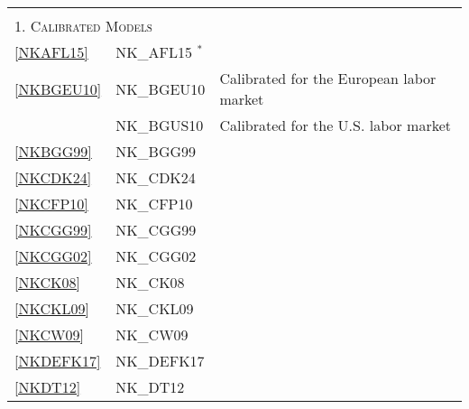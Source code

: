 \documentclass[11pt,a4paper]{article}
\begin{document}
	\vspace{-2cm}
	\begin{table}[H]
		\label{tab:modov}
		\begin{tabularx}{\textwidth}{lll}
			\hline \hline
			&& \\
			\multicolumn{3}{l}{\textsc{1. Calibrated Models}} \\
			\ref{NKAFL15} & NK\_AFL15 $ ^{\ast}$  & \cite{Angelonietal2015} \\
			\ref{NKBGEU10} & NK\_BGEU10 & \cite{BlanchardGali10} Calibrated for the European labor market \\
			& NK\_BGUS10 & \cite{BlanchardGali10} Calibrated for the U.S. labor market\\
			\ref{NKBGG99} & NK\_BGG99 & \cite{BernankeGertlerGilchrist1999} \\
			\ref{NKCDK24} & NK\_CDK24 & \cite{chan2024energy}  \\
			\ref{NKCFP10} & NK\_CFP10 & \cite{carlstrom2010optimal}  \\
			\ref{NKCGG99} & NK\_CGG99 & \cite{ClaridaGaliGertler1999}  \\
			\ref{NKCGG02}  & NK\_CGG02 & \cite{ClaridaGaliGertler2002}  \\
			\ref{NKCK08} & NK\_CK08 & \cite{ChristoffelKuester2008} \\
			\ref{NKCKL09} & NK\_CKL09 & \cite{ChristoffelKuesterLinzert2009} \\
			\ref{NKCW09} & NK\_CW09 & \cite{CurdiaWoodford2009} \\
			\ref{NKDEFK17} & NK\_DEFK17 & \cite{delnegro2017eggertson} \\
			\ref{NKDT12} & NK\_DT12 & \cite{defiore2012tristani} \\

\end{tabularx}
\end{table}
\end{document}
